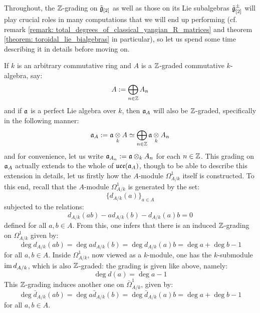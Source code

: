         \begin{remark} \label{remark: Z_gradings_on_toroidal_lie_algebras}
            Throughout, the $\mathbb{Z}$-grading on $\tilde{\mathfrak{g}}_{[2]}$ as well as those on its Lie subalgebras $\tilde{\mathfrak{g}}_{[2]}^{\pm}$ will play crucial roles in many computations that we will end up performing (cf. remark \ref{remark: total_degrees_of_classical_yangian_R_matrices} and theorem \ref{theorem: toroidal_lie_bialgebras} in particular), so let us spend some time describing it in details before moving on.

            If $k$ is an arbitrary commutative ring and $A$ is a $\mathbb{Z}$-graded commutative $k$-algebra, say:
                $$A := \bigoplus_{n \in \mathbb{Z}} A_n$$
            and if $\mathfrak{a}$ is a perfect Lie algebra over $k$, then $\mathfrak{a}_A$ will also be $\mathbb{Z}$-graded, specifically in the following manner:
                $$\a_A := \a \tensor_k A \cong \bigoplus_{n \in \Z} \a \tensor_k A_n$$
            and for convenience, let us write $\a_{A_n} := \a \tensor_k A_n$ for each $n \in \mathbb{Z}$. This grading on $\mathfrak{a}_A$ actually extends to the whole of $\mathfrak{uce}(\mathfrak{a}_A)$, though to be able to describe this extension in details, let us firstly how the $A$-module $\Omega^1_{A/k}$ itself is constructed. To this end, recall that the $A$-module $\Omega^1_{A/k}$ is generated by the set:
                $$\{d_{A/k}(a)\}_{a \in A}$$
            subjected to the relations:
                $$d_{A/k}(ab) - a d_{A/k}(b) - d_{A/k}(a) b = 0$$
            defined for all $a, b \in A$. From this, one infers that there is an induced $\mathbb{Z}$-grading on $\Omega^1_{A/k}$ given by:
                $$\deg d_{A/k}(ab) = \deg a d_{A/k}(b) = \deg d_{A/k}(a) b = \deg a + \deg b - 1$$
            for all $a, b \in A$. Inside $\Omega^1_{A/k}$, now viewed as a $k$-module, one has the $k$-submodule $\operatorname{im} d_{A/k}$, which is also $\mathbb{Z}$-graded: the grading is given like above, namely:
                $$\deg d(a) = \deg a - 1$$
            This $\mathbb{Z}$-grading induces another one on $\bar{\Omega}^1_{A/k}$, given by:
                $$\deg \bar{d}_{A/k}(ab) = \deg a \bar{d}_{A/k}(b) = \deg \bar{d}_{A/k}(a) b = \deg a + \deg b - 1$$
            for all $a, b \in A$.


\end{remark}
